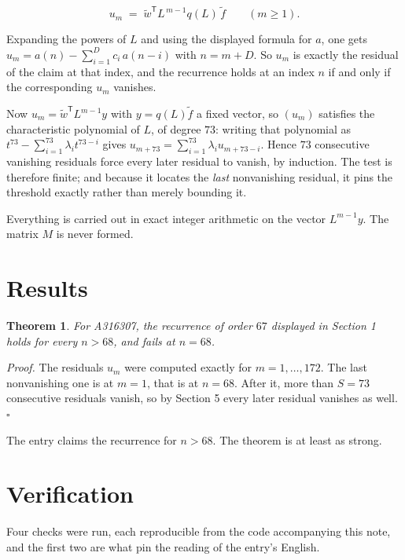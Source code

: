 \documentclass[11pt]{article}
\newtheorem{theorem}{Theorem}
\theoremstyle{definition}
\begin{document}
\[u_m \;=\; \tilde w^{\mathsf T} L^{\,m-1} q(L)\,\tilde f \qquad (m \ge 1).\]

Expanding the powers of $L$ and using the displayed formula for $a$, one gets $u_m = a(n) - \sum_{i=1}^{D} c_i\,a(n-i)$ with $n = m + D$. So $u_m$ is exactly the residual of the claim at that index, and the recurrence holds at an index $n$ if and only if the corresponding $u_m$ vanishes.

Now $u_m = \tilde w^{\mathsf T} L^{m-1} y$ with $y = q(L)\tilde f$ a fixed vector, so $(u_m)$ satisfies the characteristic polynomial of $L$, of degree $73$: writing that polynomial as $t^{73} - \sum_{i=1}^{73} \lambda_i t^{73-i}$ gives $u_{m+73} = \sum_{i=1}^{73} \lambda_i u_{m+73-i}$. Hence $73$ consecutive vanishing residuals force every later residual to vanish, by induction. The test is therefore finite; and because it locates the {\itshape last} nonvanishing residual, it pins the threshold exactly rather than merely bounding it.

Everything is carried out in exact integer arithmetic on the vector $L^{m-1}y$. The matrix $M$ is never formed.

\section{Results}

\begin{theorem} For A316307, the recurrence of order $67$ displayed in Section 1 holds for every $n > 68$, and fails at $n = 68$.\end{theorem}

{\itshape Proof.} The residuals $u_m$ were computed exactly for $m = 1,\dots,172$. The last nonvanishing one is at $m = 1$, that is at $n = 68$. After it, more than $S = 73$ consecutive residuals vanish, so by Section 5 every later residual vanishes as well. $\square$

The entry claims the recurrence for $n > 68$. The theorem is at least as strong.

\section{Verification}

Four checks were run, each reproducible from the code accompanying this note, and the first two are what pin the reading of the entry's English.
\end{document}
